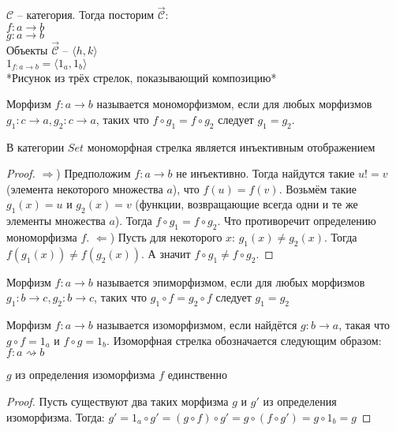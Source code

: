 $\mathcal{C}$ -- категория. Тогда посторим $\overrightarrow{\mathcal{C}}$: \\
$f\colon a \to b$ \\
$g\colon a \to b$ \\

Объекты $\overrightarrow{\mathcal{C}}$ -- $\langle h, k \rangle$ \\
$1_{f\colon a \to b} = \langle 1_a, 1_b \rangle$ \\

*Рисунок из трёх стрелок, показывающий композицию* \\

\begin{defn}
  Морфизм $f \colon a \to b$ называется мономорфизмом, если для любых морфизмов
  $g_1 \colon c \to a, g_2 \colon c \to a$, таких что $f \circ g_1 = f \circ g_2$
  следует $g_1 = g_2$.
\end{defn}

\begin{thm}
  В категории $Set$ мономорфная стрелка является инъективным отображением
\end{thm}
\begin{proof}
  $\Rightarrow$) Предположим $f \colon a \to b$ не инъективно. Тогда найдутся такие $u != v$
  (элемента некоторого множества $a$), что $f(u) = f(v)$. Возьмём такие
  $g_1(x) = u$ и $g_2(x) = v$ (функции, возвращающие всегда одни и те же
  элементы множества $a$). Тогда $f \circ g_1 = f \circ g_2$. Что противоречит
  определению мономорфизма $f$.
  $\Leftarrow$) Пусть для некоторого $x$: $g_1(x) \ne g_2(x)$. Тогда $f(g_1(x))
  \ne f(g_2(x))$. А значит $f \circ g_1 \ne f \circ g_2$.
\end{proof}

\begin{defn}
  Морфизм $f \colon a \to b$ называется эпиморфизмом, если для любых морфизмов
  $g_1 \colon b \to c, g_2 \colon b \to c$, таких что $g_1 \circ f = g_2 \circ f$
  следует $g_1 = g_2$
\end{defn}

\begin{defn}
  Морфизм $f \colon a \to b$ называется изоморфизмом, если найдётся
  $g \colon b \to a$, такая что $g \circ f = 1_a$ и $f \circ g = 1_b$.
  Изоморфная стрелка обозначается следующим образом:
  $f \colon a \rightsquigarrow b$
\end{defn}

\begin{stmt}
  $g$ из определения изоморфизма $f$ единственно
\end{stmt}
\begin{proof}
  Пусть существуют два таких морфизма $g$ и $g'$ из определения изоморфизма. Тогда:
  $g' = 1_a \circ g' = (g \circ f) \circ g' = g \circ (f \circ g') = g \circ 1_b = g$
\end{proof}

